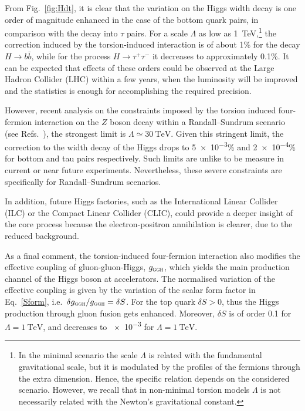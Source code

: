 \documentclass{ws-mpla}
\renewcommand{\(}{\left(}
\renewcommand{\)}{\right)}
\renewcommand{\[}{\left[}
\renewcommand{\]}{\right]}
\begin{document}
From Fig.~\ref{fig:Hdt}, it is clear that the variation on the Higgs width decay is one order of magnitude enhanced in the case of the bottom quark pairs, in comparison with the decay into $\tau$ pairs. For a scale $\Lambda$ as low as \SI{1}{\TeV},\footnote{In the minimal scenario the scale $\Lambda$ is related with the fundamental gravitational scale, but it is modulated by the profiles of the fermions through the extra dimension. Hence, the specific relation depends on the considered scenario. However, we recall that in non-minimal torsion models $\Lambda$ is not necessarily related with the Newton's gravitational constant.} the correction induced by the torsion-induced interaction is of about \num{1}\% for the decay $H \to b \bar{b}$, while for the process $H \to \tau^+ \tau^-$ it decreases to approximately \num{.1}\%. It can be expected that effects of these orders could be observed at the Large Hadron Collider (LHC) within a few years, when the luminosity will be improved and the statistics is enough for accomplishing the required precision.

However, recent analysis on the constraints imposed by the torsion induced four-fermion interaction on the $Z$ boson decay within a Randall--Sundrum scenario (see Refs.~), the strongest limit is $\Lambda \simeq \SI{30}{\TeV}$. Given this stringent limit, the correction to the width decay of the Higgs drops to \num[exponent-product = \cdot]{5e-3}\% and \num[exponent-product = \cdot]{2e-4}\% for bottom and tau pairs respectively. Such limits are unlike to be measure in current or near future experiments. Nevertheless, these severe constraints are specifically for Randall--Sundrum scenarios.

In addition, future Higgs factories, such as the International Linear Collider (ILC) or the Compact Linear Collider (CLIC), could provide a deeper insight of the core process because the electron-positron annihilation is clearer, due to the reduced background.

As a final comment, the torsion-induced four-fermion interaction also modifies the effective coupling of gluon-gluon-Higgs, $g_{\textsc{ggh}}$, which yields the main production channel of the Higgs boson at accelerators. The normalised variation of the effective coupling is given by the variation of the scalar form factor in Eq.~\eqref{Sform}, i.e.~$\delta g_{\textsc{ggh}} / g_{\textsc{ggh}} = \delta S$. For the top quark $\delta S > 0$, thus the Higgs production through gluon fusion gets enhanced. Moreover, $\delta S$ is of order \num{.1} for $\Lambda = \SI{1}{\TeV}$, and decreases to \num{e-3} for $\Lambda = \SI{1}{\TeV}$.
\end{document}
